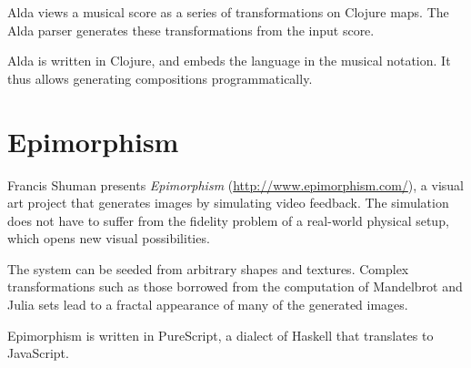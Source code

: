 \documentclass{sigplanconf}
\begin{document}
Alda views a musical score as a series of transformations on Clojure
maps.  The Alda parser generates these transformations from the input
score.

Alda is written in Clojure, and embeds the language in the musical
notation.  It thus allows generating compositions programmatically.

\section{Epimorphism}

Francis Shuman presents \textit{Epimorphism} (\url{http://www.epimorphism.com/}), a visual art project that
generates images by simulating video feedback.  The simulation does
not have to suffer from the fidelity problem of a real-world physical
setup, which opens new visual possibilities.

The system can be seeded from arbitrary shapes and textures.  Complex
transformations such as those borrowed from the computation of
Mandelbrot and Julia sets lead to a fractal appearance of many of the
generated images.

Epimorphism is written in PureScript, a dialect of Haskell that
translates to JavaScript.
\end{document}
